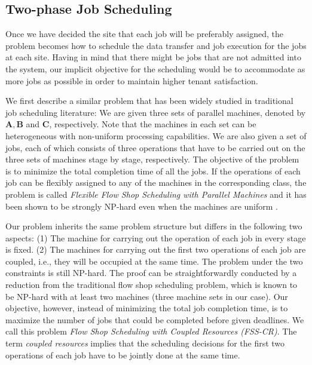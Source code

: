 \documentclass{article}
\begin{document}
\subsection{Two-phase Job Scheduling}

Once we have decided the site that each job will be preferably assigned, the problem becomes how to schedule the data transfer and job execution for the jobs at each site. Having in mind that there might be jobs that are not admitted into the system, our implicit objective for the scheduling would be to accommodate as more jobs as possible in order to maintain higher tenant satisfaction.


We first describe a similar problem that has been widely studied in traditional job scheduling literature: We are given three sets of parallel machines, denoted by $\mathbf{A}, \mathbf{B}$ and $\mathbf{C}$, respectively. Note that the machines in each set can be heterogeneous with non-uniform processing capabilities. We are also given a set of jobs, each of which consists of three operations that have to be carried out on the three sets of machines stage by stage, respectively. The objective of the problem is to minimize the total completion time of all the jobs. If the operations of each job can be flexibly assigned to any of the machines in the corresponding class, the problem is called {\em Flexible Flow Shop Scheduling with Parallel Machines} and it has been shown to be strongly NP-hard even when the machines are uniform \cite{Kyparisis-OR-2006}. 

Our problem inherits the same problem structure but differs in the following two aspects: (1) The machine for carrying out the operation of each job in every stage is fixed. (2) The machines for carrying out the first two operations of each job are coupled, i.e., they will be occupied at the same time. The problem under the two constraints is still NP-hard. The proof can be straightforwardly conducted by a reduction from the traditional flow shop scheduling problem, which is known to be NP-hard with at least two machines (three machine sets in our case). Our objective, however, instead of minimizing the total job completion time, is to maximize the number of jobs that could be completed before given deadlines. We call this problem {\em Flow Shop Scheduling with Coupled Resources (FSS-CR)}.
The term {\em coupled resources} implies that the scheduling decisions for the first two operations of each job have to be jointly done at the same time.
\end{document}
